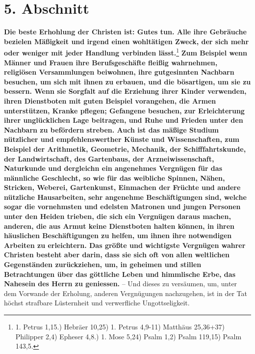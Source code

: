 \section{5. Abschnitt} \label{kap15_ab5}

\label{ref:15_05_freizeitbeschaeftigung}
\textbf{Die beste Erhohlung der Christen ist: Gutes tun. Alle ihre Gebräuche
bezielen
Mäßigkeit und irgend einen wohltätigen Zweck, der sich mehr oder weniger mit
jeder Handlung verbinden lässt.}\footnote{1. Petrus 1,15.) Hebräer 10,25) 1.
Petrus 4,9-11)
Matthäus 25,36+37) Philipper 2,4) Epheser 4,8.) 1. Mose 5,24) Psalm 1,2) Psalm
119,15) Psalm 143,5.}
\textbf{Zum Beispiel wenn Männer und Frauen ihre
Berufsgeschäfte fleißig
wahrnehmen,
religiösen Versammlungen beiwohnen, ihre gutgesinnten Nachbarn
besuchen, um sich
mit ihnen zu erbauen, und die bösartigen, um sie zu bessern. Wenn sie Sorgfalt
auf die Erziehung ihrer Kinder
verwenden, ihren
Dienstboten mit guten Beispiel
vorangehen, die Armen unterstützen, Kranke pflegen;
Gefangene
besuchen, zur
Erleichterung ihrer unglücklichen Lage beitragen, und Ruhe und Frieden unter den
Nachbarn zu befördern streben. Auch ist das mäßige
Studium nützlicher und
empfehlenswerther Künste und
Wissenschaften, zum Beispiel
der Arithmetik,
Geometrie,
Mechanik, der
Schifffahrtskunde,
der Landwirtschaft, des
Gartenbaus, der
Arzneiwissenschaft, Naturkunde und dergleichn ein
angenehmes Vergnügen für
das männliche Geschlecht, so wie für das weibliche
Spinnen, Nähen, Stricken,
Weberei, Gartenkunst, Einmachen der Früchte und andere nützliche
Hausarbeiten,
sehr angenehme Beschäftigungen sind, welche sogar die vornehmsten und edelsten
Matronen und jungen Personen unter den Heiden trieben, die sich ein Vergnügen
daraus machen, anderen, die aus Armut keine Dienstboten halten können, in ihren
häuslichen Beschäftigungen zu helfen, um ihnen ihre notwendigen Arbeiten zu
erleichtern. Das größte und wichtigste Vergnügen wahrer Christen besteht aber
darin, dass sie sich oft von allen weltlichen Gegenständen zurückziehen, um, in
geheimen und stillen Betrachtungen über das
göttliche Leben und himmlische Erbe,
das Nahesein des Herrn zu geniessen.} -- Und dieses zu versäumen, um, unter dem
Vorwande der Erholung, anderen Vergnügungen nachzugehen, ist in der Tat höchst
strafbare Lüsternheit und verwerfliche Ungottseligkeit.

